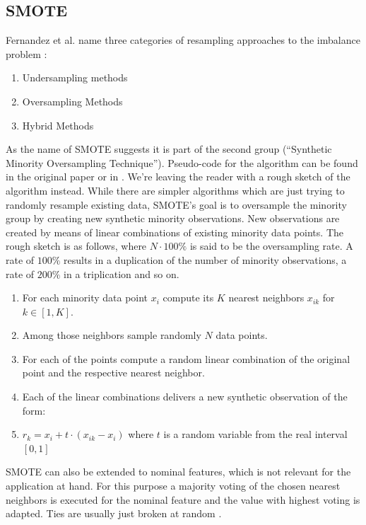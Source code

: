 \documentclass[12pt,a4paper]{article}
\begin{document}
\subsection{SMOTE}
Fernandez et al. name three categories of resampling approaches to the imbalance problem \cite{fernandez2018learning}:
\begin{enumerate}
    \item Undersampling methods
    \item Oversampling Methods
    \item Hybrid Methods
\end{enumerate}
As the name of SMOTE suggests it is part of the second group (\enquote{Synthetic Minority Oversampling Technique}). Pseudo-code for the algorithm can be found in the original paper \cite{chawla2002smote} or in \cite{fernandez2018learning}. We're leaving the reader with a rough sketch of the algorithm instead. While there are simpler algorithms which are just trying to randomly resample existing data, SMOTE's goal is to oversample the minority group by creating new synthetic minority observations. New observations are created by means of linear combinations of existing minority data points. The rough sketch is as follows, where $N\cdot100\%$ is said to be the oversampling rate. A rate of $100\%$ results in a duplication of the number of minority observations, a rate of $200\%$ in a triplication and so on.
\begin{enumerate}
    \item For each minority data point $x_i$ compute its $K$ nearest neighbors $x_{ik}$ for $k \in [1,K]$.
    \item Among those neighbors sample randomly $N$ data points.
    \item For each of the points compute a random linear combination of the original point and the respective nearest neighbor.
    \item Each of the linear combinations delivers a new synthetic observation of the form:
    \item $r_k = x_i + t\cdot\left(x_{ik}-x_i\right)$ where $t$ is a random variable from the real interval $[0,1]$
\end{enumerate}
SMOTE can also be extended to nominal features, which is not relevant for the application at hand. For this purpose a majority voting of the chosen nearest neighbors is executed for the nominal feature and the value with highest voting is adapted. Ties are usually just broken at random \cite{chawla2003smoteboost}.
\end{document}
